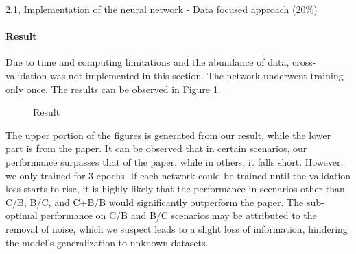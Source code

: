 \begin{task}{2.1, Implementation of the neural network - Data focused approach (20\%)}
\paragraph{Result}
Due to time and computing limitations and the abundance of data, cross-validation was not implemented in this section. The network underwent training only once. The results can be observed in Figure \ref{result_2_1}.

\begin{figure}[H]
\centering
{}
\caption{Result}
\label{result_2_1}
\end{figure}

The upper portion of the figures is generated from our result, while the lower part is from the paper. It can be observed that in certain scenarios, our performance surpasses that of the paper, while in others, it falls short. However, we only trained for 3 epochs. If each network could be trained until the validation loss starts to rise, it is highly likely that the performance in scenarios other than C/B, B/C, and C+B/B would significantly outperform the paper. The sub-optimal performance on C/B and B/C scenarios may be attributed to the removal of noise, which we suspect leads to a slight loss of information, hindering the model's generalization to unknown datasets.


\end{task}
